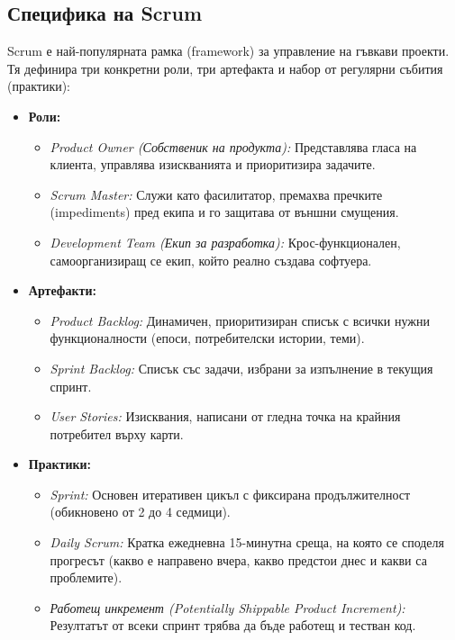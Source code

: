 \documentclass{scrartcl}
\begin{document}
\begin{FlushLeft}
\subsection{Специфика на Scrum}
Scrum е най-популярната рамка (framework) за управление на гъвкави проекти. Тя дефинира три конкретни роли, три артефакта и набор от регулярни събития (практики):
\begin{itemize}
    \item \textbf{Роли:}
    \begin{itemize}
        \item \emph{Product Owner (Собственик на продукта):} Представлява гласа на клиента, управлява изискванията и приоритизира задачите.
        \item \emph{Scrum Master:} Служи като фасилитатор, премахва пречките (impediments) пред екипа и го защитава от външни смущения.
        \item \emph{Development Team (Екип за разработка):} Крос-функционален, самоорганизиращ се екип, който реално създава софтуера.
    \end{itemize}
    \item \textbf{Артефакти:}
    \begin{itemize}
        \item \emph{Product Backlog:} Динамичен, приоритизиран списък с всички нужни функционалности (епоси, потребителски истории, теми).
        \item \emph{Sprint Backlog:} Списък със задачи, избрани за изпълнение в текущия спринт.
        \item \emph{User Stories:} Изисквания, написани от гледна точка на крайния потребител върху карти.
    \end{itemize}
    \item \textbf{Практики:}
    \begin{itemize}
        \item \emph{Sprint:} Основен итеративен цикъл с фиксирана продължителност (обикновено от 2 до 4 седмици).
        \item \emph{Daily Scrum:} Кратка ежедневна 15-минутна среща, на която се споделя прогресът (какво е направено вчера, какво предстои днес и какви са проблемите).
        \item \emph{Работещ инкремент (Potentially Shippable Product Increment):} Резултатът от всеки спринт трябва да бъде работещ и тестван код.
    \end{itemize}
\end{itemize}


\end{FlushLeft}
\end{document}
